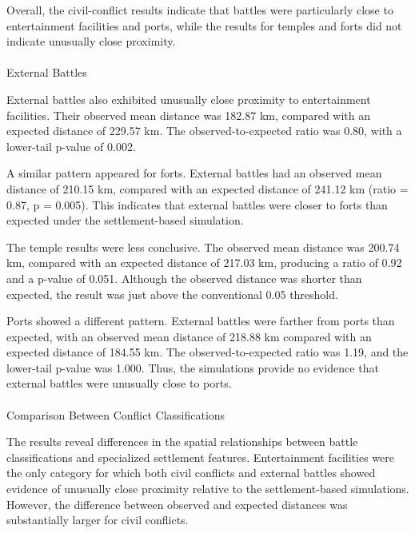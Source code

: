 \documentclass[
  letterpaper,
  DIV=11,
  numbers=noendperiod]{scrartcl}
\makeatletter
\let\oldparagraph\paragraph
\renewcommand{\paragraph}{
    \@ifstar
      \xxxParagraphStar
      \xxxParagraphNoStar
  }
\newcommand{\xxxParagraphStar}[1]{\oldparagraph*{#1}\mbox{}}
\newcommand{\xxxParagraphNoStar}[1]{\oldparagraph{#1}\mbox{}}
\makeatother
\begin{document}
Overall, the civil-conflict results indicate that battles were
particularly close to entertainment facilities and ports, while the
results for temples and forts did not indicate unusually close
proximity.

\paragraph{External Battles}\label{external-battles}

External battles also exhibited unusually close proximity to
entertainment facilities. Their observed mean distance was 182.87 km,
compared with an expected distance of 229.57 km. The
observed-to-expected ratio was 0.80, with a lower-tail p-value of 0.002.

A similar pattern appeared for forts. External battles had an observed
mean distance of 210.15 km, compared with an expected distance of 241.12
km (ratio = 0.87, p = 0.005). This indicates that external battles were
closer to forts than expected under the settlement-based simulation.

The temple results were less conclusive. The observed mean distance was
200.74 km, compared with an expected distance of 217.03 km, producing a
ratio of 0.92 and a p-value of 0.051. Although the observed distance was
shorter than expected, the result was just above the conventional 0.05
threshold.

Ports showed a different pattern. External battles were farther from
ports than expected, with an observed mean distance of 218.88 km
compared with an expected distance of 184.55 km. The
observed-to-expected ratio was 1.19, and the lower-tail p-value was
1.000. Thus, the simulations provide no evidence that external battles
were unusually close to ports.

\paragraph{Comparison Between Conflict
Classifications}\label{comparison-between-conflict-classifications}

The results reveal differences in the spatial relationships between
battle classifications and specialized settlement features.
Entertainment facilities were the only category for which both civil
conflicts and external battles showed evidence of unusually close
proximity relative to the settlement-based simulations. However, the
difference between observed and expected distances was substantially
larger for civil conflicts.
\end{document}
